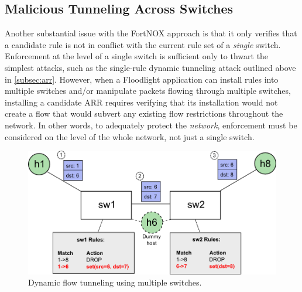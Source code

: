 
\subsection{Malicious Tunneling Across Switches}
Another substantial issue with the FortNOX approach is that it only verifies that a candidate rule is not in conflict with the current rule set of a \emph{single} switch. 
Enforcement at the level of a single switch is sufficient only to thwart the simplest attacks, such as the single-rule dynamic tunneling attack outlined above in \ref{subsec:arr}. 
However, when a Floodlight application can install rules into multiple switches and/or manipulate packets flowing through multiple switches, installing a candidate ARR requires verifying that its installation would not create a flow that would subvert any existing flow restrictions throughout the network. 
In other words, to adequately protect the \emph{network}, enforcement must be considered on the level of the whole network, not just a single switch.

\begin{figure}[ht!]
	\begin{center}
		\includegraphics[width=\columnwidth]{figs/multiSwitch_diagram.png}
		\caption{Dynamic flow tunneling using multiple switches.}
		\label{fig:dft_multi}
	\end{center}
\end{figure}

